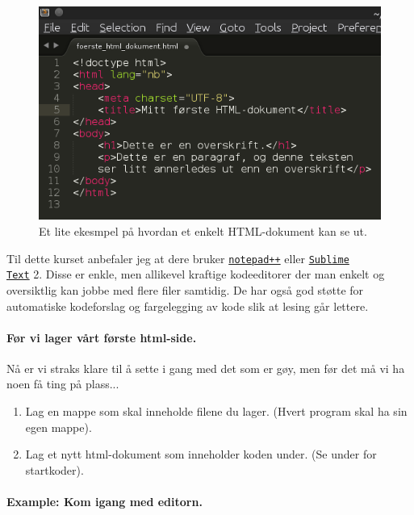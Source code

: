 \documentclass[%
oneside,                 %
final,                   %
10pt]{article}
\newenvironment{notice_mdfboxadmon}[1][]{
\begin{notice_mdfboxmdframed}[frametitle=#1]
}
{
\end{notice_mdfboxmdframed}
}
\begin{document}
\begin{figure}[t]
  \centerline{\includegraphics[width=0.5\linewidth]{figures/editor_sublime_eksempel.png}}
  \caption{
  Et lite ekesmpel på hvordan et enkelt HTML-dokument kan se ut.
  }
\end{figure}


Til dette kurset anbefaler jeg at dere bruker
\href{{https://notepad-plus-plus.org}}{\nolinkurl{notepad++}} eller \href{{http://www.sublimetext.com/2}}{\nolinkurl{Sublime
Text}} 2. Disse er enkle, men allikevel
kraftige kodeeditorer der man enkelt og oversiktlig kan jobbe med
flere filer samtidig. De har også god støtte for automatiske
kodeforslag og fargelegging av kode slik at lesing går lettere.

\paragraph{Før vi lager vårt første html-side.}

Nå er vi straks klare til å sette i gang med det som er gøy, men
før det må vi ha noen få ting på plass...


\begin{notice_mdfboxadmon}
\begin{enumerate}
\item Lag en mappe som skal inneholde filene du lager. (Hvert program skal ha sin egen mappe).

\item Lag et nytt html-dokument som inneholder koden under. (Se under for startkoder).
\end{enumerate}

\noindent
\end{notice_mdfboxadmon}



\paragraph{Example: Kom igang med editorn.}
\label{example:komigang}
\end{document}
